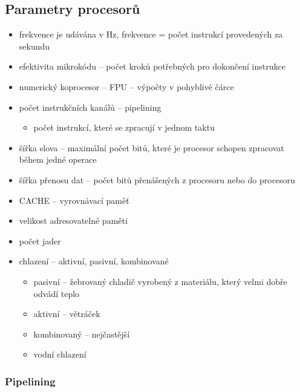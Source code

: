 \documentclass[a4paper,12pt]{article}
\providecommand{\tightlist}{%
\setlength{\itemsep}{0pt}\setlength{\parskip}{0pt}}
\begin{document}
\subsection{Parametry procesorů}

\begin{itemize}
\tightlist
\item frekvence je udávána v Hz, frekvence = počet instrukcí provedených za
  sekundu
\item efektivita mikrokódu -- počet kroků potřebných pro dokončení instrukce
\item numerický koprocesor -- FPU -- výpočty v pohyblivé čárce
\item počet instrukčních kanálů -- pipelining

  \begin{itemize}
  \tightlist
  \item počet instrukcí, které se zpracují v jednom taktu
  \end{itemize}
\item šířka slova -- maximální počet bitů, které je procesor schopen
  zpracovat během jedné operace
\item šířka přenosu dat -- počet bitů přenášených z procesoru nebo do
  procesoru
\item CACHE -- vyrovnávací paměť
\item velikost adresovatelné paměti
\item počet jader
\item chlazení -- aktivní, pasivní, kombinované

  \begin{itemize}
  \tightlist
  \item pasivní -- žebrovaný chladič vyrobený z materiálu, který velmi dobře
    odvádí teplo
  \item aktivní -- větráček
  \item kombinovaný -- nejčastější
  \item vodní chlazení
  \end{itemize}
\end{itemize}

\subsubsection{Pipelining}
\end{document}
